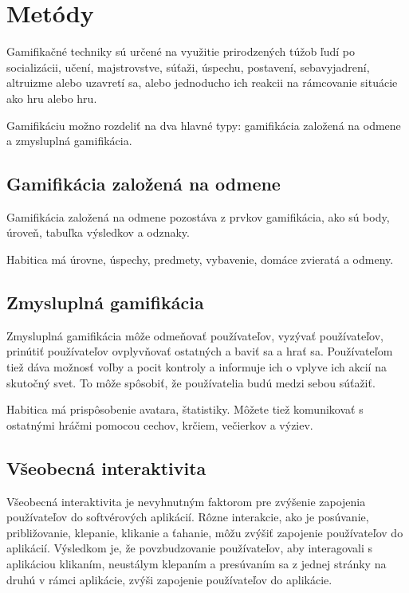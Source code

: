 \documentclass[10pt,twoside,slovak,a4paper]{article}
\begin{document}
\section{Metódy} \label{methods}

Gamifikačné techniky sú určené na využitie prirodzených túžob ľudí po socializácii, učení, majstrovstve, súťaži, úspechu, postavení, sebavyjadrení, altruizme alebo uzavretí sa, alebo jednoducho ich reakcii na rámcovanie situácie ako hru alebo hru.\cite{Shallow}

Gamifikáciu možno rozdeliť na dva hlavné typy: gamifikácia založená na odmene a zmysluplná gamifikácia. \cite{Methods}

\subsection{Gamifikácia založená na odmene} \label{methods:reward}
Gamifikácia založená na odmene pozostáva z prvkov gamifikácia, ako sú body, úroveň, tabuľka výsledkov a odznaky.

\cite{Methods} Habitica má úrovne, úspechy, predmety, vybavenie, domáce zvieratá a odmeny.

\subsection{Zmysluplná gamifikácia} \label{methods:meaningful}
Zmysluplná gamifikácia môže odmeňovať používateľov, vyzývať používateľov, prinútiť používateľov ovplyvňovať ostatných a baviť sa a hrať sa. Používateľom tiež dáva možnosť voľby a pocit kontroly a informuje ich o vplyve ich akcií na skutočný svet. To môže spôsobiť, že používatelia budú medzi sebou súťažiť.\cite{Methods}

Habitica má prispôsobenie avatara, štatistiky. Môžete tiež komunikovať s ostatnými hráčmi pomocou cechov, krčiem, večierkov a výziev.

\subsection{Všeobecná interaktivita} \label{methods:interactivity}
Všeobecná interaktivita je nevyhnutným faktorom pre zvýšenie zapojenia používateľov do softvérových aplikácií. Rôzne interakcie, ako je posúvanie, približovanie, klepanie, klikanie a ťahanie, môžu zvýšiť zapojenie používateľov do aplikácií. Výsledkom je, že povzbudzovanie používateľov, aby interagovali s aplikáciou klikaním, neustálym klepaním a presúvaním sa z jednej stránky na druhú v rámci aplikácie, zvýši zapojenie používateľov do aplikácie.\cite{Methods}
\end{document}
